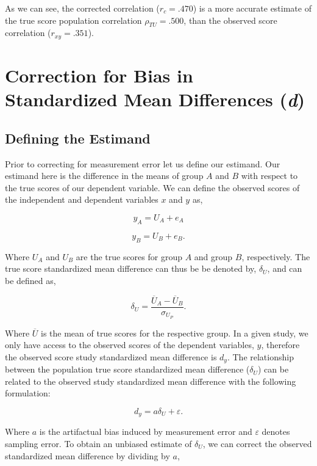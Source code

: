 \documentclass[
  letterpaper,
  DIV=11,
  numbers=noendperiod]{scrreprt}
\begin{document}
As we can see, the corrected correlation (\(r_c = .470\)) is a more
accurate estimate of the true score population correlation
\(\rho_{TU} = .500\), than the observed score correlation
(\(r_{xy}=.351\)).

\hypertarget{correction-for-bias-in-standardized-mean-differences-d}{%
\section{\texorpdfstring{Correction for Bias in Standardized Mean
Differences
(\emph{d})}{Correction for Bias in Standardized Mean Differences (d)}}\label{correction-for-bias-in-standardized-mean-differences-d}}

\hypertarget{defining-the-estimand-1}{%
\subsection{Defining the Estimand}\label{defining-the-estimand-1}}

Prior to correcting for measurement error let us define our estimand.
Our estimand here is the difference in the means of group \(A\) and
\(B\) with respect to the true scores of our dependent variable. We can
define the observed scores of the independent and dependent variables
\(x\) and \(y\) as,

\[
y_A = U_A + e_A
\]

\[
y_B = U_B + e_B.
\]

Where \(U_A\) and \(U_B\) are the true scores for group \(A\) and group
\(B\), respectively. The true score standardized mean difference can
thus be be denoted by, \(\delta_{U}\), and can be defined as,

\[
\delta_{U} = \frac{\overline{U}_A - \overline{U}_B}{\sigma_{U_P}}.
\]

Where \(\overline{U}\) is the mean of true scores for the respective
group. In a given study, we only have access to the observed scores of
the dependent variables, \(y\), therefore the observed score study
standardized mean difference is \(d_{y}\). The relationship between the
population true score standardized mean difference (\(\delta_U\)) can be
related to the observed study standardized mean difference with the
following formulation:

\[
d_y = a\delta_U+\varepsilon.
\]

Where \(a\) is the artifactual bias induced by measurement error and
\(\varepsilon\) denotes sampling error. To obtain an unbiased estimate
of \(\delta_{U}\), we can correct the observed standardized mean
difference by dividing by \(a\),
\end{document}
